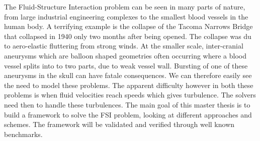 
The Fluid-Structure Interaction problem can be seen in many parts of nature, from large industrial engineering complexes to the smallest blood vessels in the human body. A terrifying example is the collapse of the Tacoma Narrows Bridge that collapsed in 1940 only two months after being opened. The collapse was du to aero-elastic fluttering from strong winds. At the smaller scale, inter-cranial aneurysms which are balloon shaped geometries often occurring where a blood vessel splits into to two parts, due to weak vessel wall. Bursting of one of these aneurysms in the skull can have fatale consequences. We can therefore easily see the need to model these problems. The apparent difficulty however in both these problems is when fluid velocities reach speeds which gives turbulence. The solvers need then to handle these turbulences. The main goal of this master thesis is to build a framework to solve the FSI problem, looking at different approaches and schemes. The framework will be validated and verified through well known benchmarks.  


